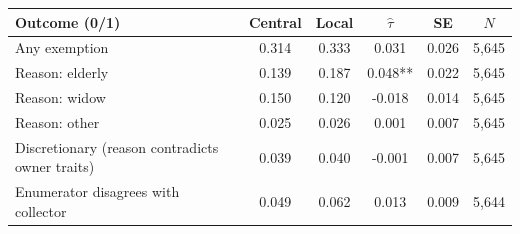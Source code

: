 \begin{tabular}{lccccc}
\toprule
Outcome (0/1) & Central & Local & $\hat\tau$ & SE & $N$\\
\midrule
Any exemption & 0.314 & 0.333 & 0.031 & 0.026 & 5,645\\
Reason: elderly & 0.139 & 0.187 & 0.048** & 0.022 & 5,645\\
Reason: widow & 0.150 & 0.120 & -0.018 & 0.014 & 5,645\\
Reason: other & 0.025 & 0.026 & 0.001 & 0.007 & 5,645\\
Discretionary (reason contradicts owner traits) & 0.039 & 0.040 & -0.001 & 0.007 & 5,645\\
Enumerator disagrees with collector & 0.049 & 0.062 & 0.013 & 0.009 & 5,644\\
\bottomrule
\end{tabular}
